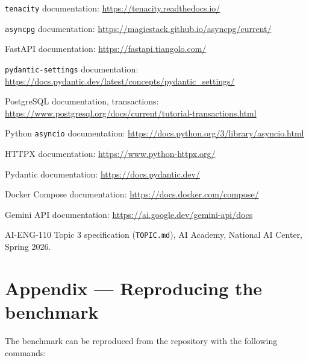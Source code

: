 \documentclass[11pt,a4paper]{article}
\begin{document}
\begin{enumerate}
[label={[\arabic*]},leftmargin=2.4em,itemsep=2pt]

  \item \texttt{tenacity} documentation:
  \url{https://tenacity.readthedocs.io/}

  \item \texttt{asyncpg} documentation:
  \url{https://magicstack.github.io/asyncpg/current/}

  \item FastAPI documentation:
  \url{https://fastapi.tiangolo.com/}

  \item \texttt{pydantic-settings} documentation:
  \url{https://docs.pydantic.dev/latest/concepts/pydantic_settings/}

  \item PostgreSQL documentation, transactions:
  \url{https://www.postgresql.org/docs/current/tutorial-transactions.html}

  \item Python \texttt{asyncio} documentation:
  \url{https://docs.python.org/3/library/asyncio.html}

  \item HTTPX documentation:
  \url{https://www.python-httpx.org/}

  \item Pydantic documentation:
  \url{https://docs.pydantic.dev/}

  \item Docker Compose documentation:
  \url{https://docs.docker.com/compose/}

  \item Gemini API documentation:
  \url{https://ai.google.dev/gemini-api/docs}

  \item AI-ENG-110 Topic 3 specification (\texttt{TOPIC.md}), AI Academy,
  National AI Center, Spring 2026.

\end{enumerate}


\appendix

\section{Appendix --- Reproducing the benchmark}

The benchmark can be reproduced from the repository with the following commands:
\end{document}
